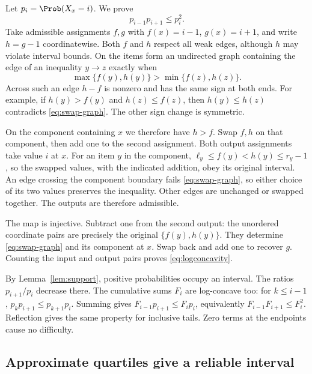 Let $p_i=\Prob(X_x=i)$. We prove
\begin{equation}
                              p_{i-1}p_{i+1}\leq p_i^2.
\label{eq:logconcavity}
\end{equation}
Take admissible assignments $f,g$ with $f(x)=i-1$, $g(x)=i+1$,
and write $h=g-1$ coordinatewise. Both $f$ and $h$ respect all weak
edges, although $h$ may violate interval bounds.
On the items form an undirected graph containing the edge of an inequality
$y\to z$ exactly when
\begin{equation}
                  \max\{f(y),h(y)\}>\min\{f(z),h(z)\}.
\label{eq:swap-graph}
\end{equation}
Across such an edge $h-f$ is nonzero and has the same sign at both ends.
For example, if $h(y)>f(y)$ and $h(z)\leq f(z)$, then
$h(y)\leq h(z)$ contradicts \eqref{eq:swap-graph}. The other sign change
is symmetric.

On the component containing $x$ we therefore have $h>f$.
Swap $f,h$ on that component, then add one to the second assignment.
Both output assignments take value $i$ at $x$.
For an item $y$ in the component,
$\ell_y\leq f(y)<h(y)\leq r_y-1$, so the swapped values, with the
indicated addition, obey its original interval.
An edge crossing the component boundary fails
\eqref{eq:swap-graph}, so either choice of its two values preserves
the inequality. Other edges are unchanged or swapped together.
The outputs are therefore admissible.

The map is injective. Subtract one from the second output: the unordered
coordinate pairs are precisely the original $\{f(y),h(y)\}$.
They determine \eqref{eq:swap-graph} and its component at $x$.
Swap back and add one to recover $g$. Counting the input and output
pairs proves \eqref{eq:logconcavity}.

By Lemma~\ref{lem:support}, positive probabilities occupy an interval.
The ratios $p_{i+1}/p_i$ decrease there. The cumulative sums $F_i$ are
log-concave too: for $k\leq i-1$,
$p_kp_{i+1}\leq p_{k+1}p_i$. Summing gives
$F_{i-1}p_{i+1}\leq F_ip_i$, equivalently
$F_{i-1}F_{i+1}\leq F_i^2$. Reflection gives the same property for
inclusive tails. Zero terms at the endpoints cause no difficulty.

\subsection{Approximate quartiles give a reliable interval}
\label{app:quartiles}

